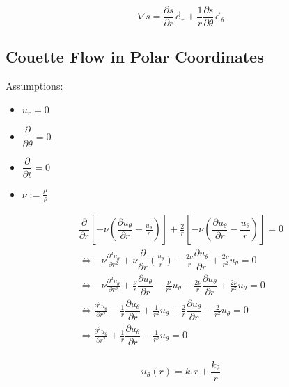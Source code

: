 \documentclass{article}
\numberwithin{equation}{section}
\newcommand{\pd}[2]{\dfrac{\partial #1}{\partial #2}}
\newcommand{\unitvec}[1]{\vec{e}_{#1}}
\begin{document}
\begin{equation}
    \nabla s = \pd{s}{r} \unitvec{r} + \frac1r \pd{s}{\theta} \vec{e}_\theta
\end{equation}

\subsection{Couette Flow in Polar Coordinates}

Assumptions:
\begin{itemize}
    \item $u_r = 0$
    \item $\pd{}{\theta} = 0$
    \item $\pd{}{t} = 0$
    \item $\nu := \frac{\mu}{\rho}$
\end{itemize}

\begin{equation}
    \begin{gathered}
        \pd{}{r} \left[
            -\nu \left(
                \pd{u_\theta}{r} - \frac{u_\theta}{r}
            \right)
        \right] +
        \frac2r \left[
            -\nu \left(\pd{u_\theta}{r} - \dfrac{u_\theta}{r}\right)
        \right]
        = 0 \\
        \Leftrightarrow
        -\nu \frac{\partial^2 u_\theta}{\partial r^2}
        +\nu \pd{}{r} \left(\frac{u_\theta}{r}\right)
        - \frac{2\nu}{r} \pd{u_\theta}{r}
        + \frac{2\nu}{r^2} u_\theta
        = 0 \\
        \Leftrightarrow
        -\nu \frac{\partial^2 u_\theta}{\partial r^2}
        +\frac{\nu}{r} \pd{u_\theta}{r}
        -\frac{\nu}{r^2} u_\theta
        - \frac{2\nu}{r} \pd{u_\theta}{r}
        + \frac{2\nu}{r^2} u_\theta
        = 0 \\
        \Leftrightarrow
        \frac{\partial^2 u_\theta}{\partial r^2}
        -\frac{1}{r} \pd{u_\theta}{r}
        +\frac{1}{r^2} u_\theta
        +\frac{2}{r} \pd{u_\theta}{r}
        -\frac{2}{r^2} u_\theta
        = 0 \\
        \Leftrightarrow
        \frac{\partial^2 u_\theta}{\partial r^2}
        +\frac{1}{r} \pd{u_\theta}{r}
        -\frac{1}{r^2} u_\theta
        = 0 \\
    \end{gathered}
\end{equation}

\begin{equation}
    u_\theta(r) = k_1 r + \frac{k_2}{r}
\end{equation}
\end{document}
